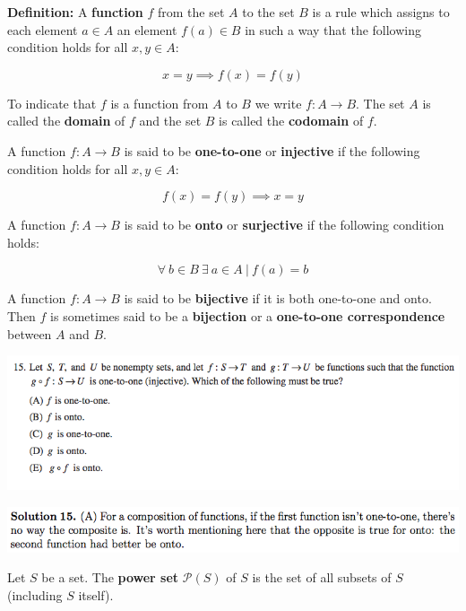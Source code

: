 \documentclass{article}
\begin{document}

\textbf{Definition:} A \textbf{function} \(f\) from the set \(A\) to the set \(B\) is a rule which assigns to each element \(a \in A\) an element \(f(a) \in B\) in such a way that the following condition holds for all \(x, y \in A\):

\[
x = y \implies f(x) = f(y)
\]

To indicate that \(f\) is a function from \(A\) to \(B\) we write \(f: A \to B\). The set \(A\) is called the \textbf{domain} of \(f\) and the set \(B\) is called the \textbf{codomain} of \(f\).


A function \(f: A \to B\) is said to be \textbf{one-to-one} or \textbf{injective} if the following condition holds for all \(x, y \in A\):

\[
f(x) = f(y) \implies x = y
\]

A function \(f: A \to B\) is said to be \textbf{onto} or \textbf{surjective} if the following condition holds:

\[
\forall \ b \in B \ \exists \ a \in A \ | \ f(a) = b
\]

A function \(f: A \to B\) is said to be \textbf{bijective} if it is both one-to-one and onto. Then \(f\) is sometimes said to be a \textbf{bijection} or a \textbf{one-to-one correspondence} between \(A\) and \(B\).

\includegraphics[scale=0.65]{1268_15}

\includegraphics[scale=0.65]{1268_15s}

Let \(S\) be a set. The \textbf{power set} \(\mathcal{P}(S)\) of \(S\) is the set of all subsets of \(S\) (including \(S\) itself).
\end{document}
